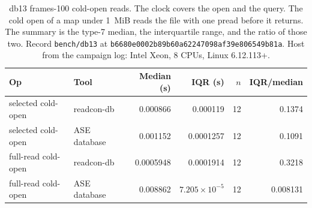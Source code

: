 \begin{table}[tbp]
\centering
\scriptsize
\caption{db13 frames-100 cold-open reads.
The clock covers the open and the query.
The cold open of a map under 1~MiB reads the file with one pread before it returns.
The summary is the type-7 median, the interquartile range, and the ratio of those two.
Record \texttt{bench/db13} at \texttt{b6680e0002b89b60a62247098af39e806549b81a}.
Host from the campaign log: Intel Xeon, 8 CPUs, Linux 6.12.113+.}
\label{tab:db13}
\begin{tabular}{@{}llrrrr@{}}
\toprule
Op & Tool & Median (s) & IQR (s) & $n$ & IQR/median \\
\midrule
selected cold-open & readcon-db & 0.000866 & 0.000119 & 12 & 0.1374 \\
selected cold-open & ASE database & 0.001152 & 0.0001257 & 12 & 0.1091 \\
full-read cold-open & readcon-db & 0.0005948 & 0.0001914 & 12 & 0.3218 \\
full-read cold-open & ASE database & 0.008862 & $7.205\times 10^{-5}$ & 12 & 0.008131 \\
\bottomrule
\end{tabular}
\end{table}
